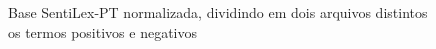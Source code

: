 \begin{figure}[H]
	\caption{Base SentiLex-PT normalizada, dividindo em dois arquivos distintos os termos positivos e negativos}
	
\end{figure}

